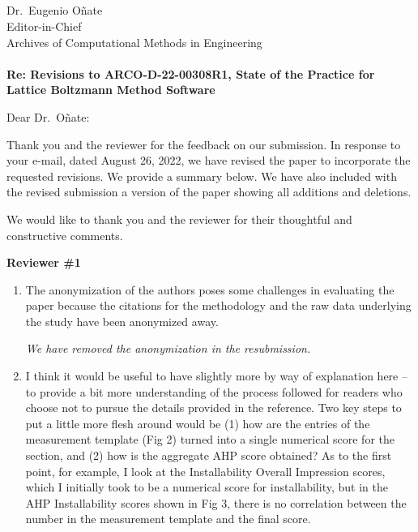 \documentclass[12pt]{casletter}
\begin{document}
\begin{letter}{~\\
    ~\\
    ~\\
    ~\\
    Dr.\ Eugenio O\~{n}ate\\
    Editor-in-Chief\\
    Archives of Computational Methods in Engineering\\
    ~\\
    {\bf Re: Revisions to ARCO-D-22-00308R1, State of the Practice for Lattice
    Boltzmann Method Software}}

  \opening {Dear Dr.\ O\~{n}ate:}

  Thank you and the reviewer for the feedback on our submission.  In response to
  your e-mail, dated August 26, 2022, we have revised the paper to incorporate
  the requested revisions.  We provide a summary below.  We have also included
  with the revised submission a version of the paper showing all additions and
  deletions.

  We would like to thank you and the reviewer for their thoughtful and
  constructive comments.

  \textbf{Reviewer \#1}

  \begin{enumerate}
  \item The anonymization of the authors poses some challenges in evaluating
  the paper because the citations for the methodology and the raw data
  underlying the study have been anonymized away. \medskip

    \emph{We have removed the anonymization in the resubmission.  \smallskip}

  \item I think it would be useful to have slightly more by way of explanation
  here -- to provide a bit more understanding of the process followed for
  readers who choose not to pursue the details provided in the reference.  Two
  key steps to put a little more flesh around would be (1) how are the entries
  of the measurement template (Fig 2) turned into a single numerical score for
  the section, and (2) how is the aggregate AHP score obtained?  As to the first
  point, for example, I look at the Installability Overall Impression scores,
  which I initially took to be a numerical score for installability, but in the
  AHP Installability scores shown in Fig 3, there is no correlation between the
  number in the measurement template and the final score. \medskip


\end{enumerate}
\end{letter}
\end{document}
